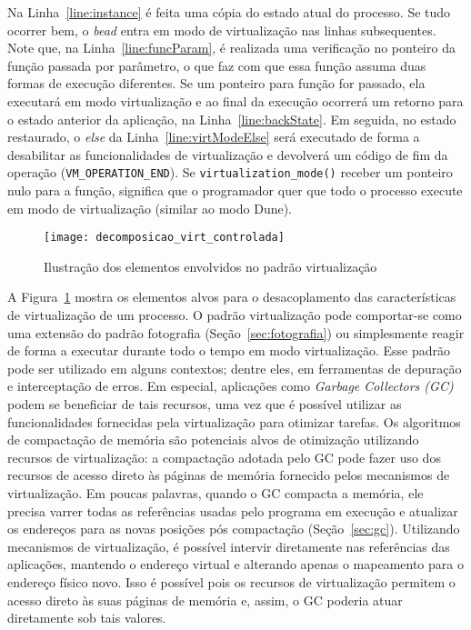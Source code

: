 Na Linha~\ref{line:instance} é feita uma cópia do estado atual do processo. Se
tudo ocorrer bem, o \emph{bead} entra em modo de virtualização nas linhas
subsequentes. Note que, na Linha~\ref{line:funcParam}, é realizada uma verificação
no ponteiro da função passada por parâmetro, o que faz com que essa função
assuma duas formas de execução diferentes. Se um ponteiro para função for
passado, ela executará em modo virtualização e ao final da execução ocorrerá um
retorno para o estado anterior da aplicação, na Linha~\ref{line:backState}. Em
seguida, no estado restaurado, o \emph{else} da Linha~\ref{line:virtModeElse}
será executado de forma a desabilitar as funcionalidades de virtualização e
devolverá um código de fim da operação (\texttt{VM\_OPERATION\_END}). Se
\texttt{virtualization\_mode()} receber um ponteiro nulo para a função,
significa que o programador quer que todo o processo execute em modo de
virtualização (similar ao modo Dune).

\begin{figure}[!h]
  \centering
  \texttt{[image: decomposicao\_virt\_controlada]}
  \caption{Ilustração dos elementos envolvidos no padrão virtualização}
  \label{fig:decomposicao_virt}
\end{figure}

A Figura~\ref{fig:decomposicao_virt} mostra os elementos alvos para o
desacoplamento das características de virtualização de um processo. O
padrão virtualização pode comportar-se como uma extensão do padrão fotografia
(Seção~\ref{sec:fotografia}) ou simplesmente reagir de forma a executar durante
todo o tempo em modo virtualização. Esse padrão pode ser utilizado em alguns
contextos; dentre eles, em ferramentas de depuração e interceptação de erros. Em
especial, aplicações como \emph{Garbage Collectors (GC)} podem se beneficiar de
tais recursos, uma vez que é possível utilizar as funcionalidades fornecidas
pela virtualização para otimizar tarefas. Os algoritmos de compactação de
memória são potenciais alvos de otimização utilizando recursos de
virtualização: a compactação adotada pelo GC pode fazer uso dos recursos de
acesso direto às páginas de memória fornecido pelos mecanismos de virtualização. Em poucas
palavras, quando o GC compacta a memória, ele precisa varrer todas as
referências usadas pelo programa em execução e atualizar os endereços para as
novas posições pós compactação (Seção~\ref{sec:gc}). Utilizando mecanismos de
virtualização, é possível intervir diretamente nas referências das aplicações,
mantendo o endereço virtual e alterando apenas o mapeamento para o endereço
físico novo. Isso é possível pois os recursos de virtualização permitem o
acesso direto às suas páginas de memória e, assim, o GC poderia atuar diretamente sob tais
valores. 


